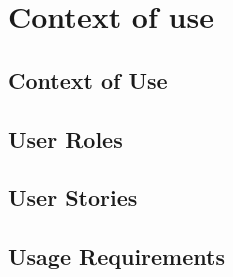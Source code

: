 \section{Context of use}
\subsection{Context of Use}
\subsection{User Roles}
\subsection{User Stories}
\subsection{Usage Requirements}